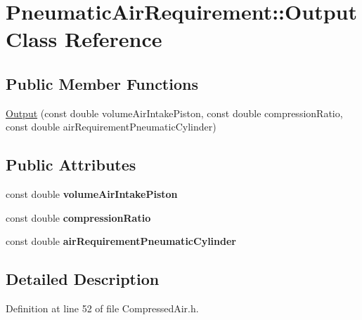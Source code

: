 \hypertarget{class_pneumatic_air_requirement_1_1_output}{}\section{Pneumatic\+Air\+Requirement\+:\+:Output Class Reference}
\label{class_pneumatic_air_requirement_1_1_output}
\subsection*{Public Member Functions}
\begin{DoxyCompactItemize}
\item 
\hyperlink{class_pneumatic_air_requirement_1_1_output_a69397f777ea0aed4b9d3a913883c8a10}{Output} (const double volume\+Air\+Intake\+Piston, const double compression\+Ratio, const double air\+Requirement\+Pneumatic\+Cylinder)
\end{DoxyCompactItemize}
\subsection*{Public Attributes}
\begin{DoxyCompactItemize}
\item 
\mbox{\label{class_pneumatic_air_requirement_1_1_output_a051ec4d07978c023ba852396e4ae0d0d}} 
const double {\bfseries volume\+Air\+Intake\+Piston}
\item 
\mbox{\label{class_pneumatic_air_requirement_1_1_output_acbf96b686e7226c6c1c5d81b4620c5d8}} 
const double {\bfseries compression\+Ratio}
\item 
\mbox{\label{class_pneumatic_air_requirement_1_1_output_a90c33f92f3f215f0b2699ce96f5e845c}} 
const double {\bfseries air\+Requirement\+Pneumatic\+Cylinder}
\end{DoxyCompactItemize}


\subsection{Detailed Description}


Definition at line 52 of file Compressed\+Air.\+h.



